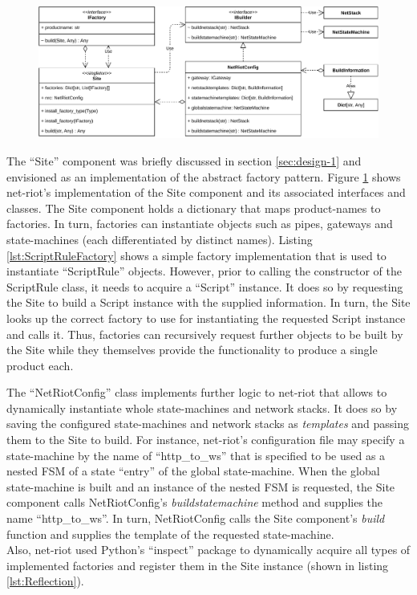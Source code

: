 \begin{figure}[h]
    \centering
    \includegraphics[width=14cm]{img/ch06/net-riot-factory.pdf}
    \label{fig:net-riot-factory}
\end{figure}
The \enquote{Site} component was briefly discussed in section \ref{sec:design-1} and envisioned as an implementation of the abstract factory pattern. Figure \ref{fig:net-riot-factory} shows net-riot's implementation of the Site component and its associated interfaces and classes. The Site component holds a dictionary that maps product-names to factories. In turn, factories can instantiate objects such as pipes, gateways and state-machines (each differentiated by distinct names). Listing \ref{lst:ScriptRuleFactory} shows a simple factory implementation that is used to instantiate \enquote{ScriptRule} objects. However, prior to calling the constructor of the ScriptRule class, it needs to acquire a \enquote{Script} instance. It does so by requesting the Site to build a Script instance with the supplied information. In turn, the Site looks up the correct factory to use for instantiating the requested Script instance and calls it. Thus, factories can recursively request further objects to be built by the Site while they themselves provide the functionality to produce a single product each.

The \enquote{NetRiotConfig} class implements further logic to net-riot that allows to dynamically instantiate whole state-machines and network stacks. It does so by saving the configured state-machines and network stacks as \emph{templates} and passing them to the Site to build. For instance, net-riot's configuration file may specify a state-machine by the name of \enquote{http\_to\_ws} that is specified to be used as a nested \ac{FSM} of a state \enquote{entry} of the global state-machine. When the global state-machine is built and an instance of the nested \ac{FSM} is requested, the Site component calls NetRiotConfig's \emph{buildstatemachine} method and supplies the name \enquote{http\_to\_ws}. In turn, NetRiotConfig calls the Site component's \emph{build} function and supplies the template of the requested state-machine.\\
Also, net-riot used Python's \enquote{inspect} package to dynamically acquire all types of implemented factories and register them in the Site instance (shown in listing \ref{lst:Reflection}).


